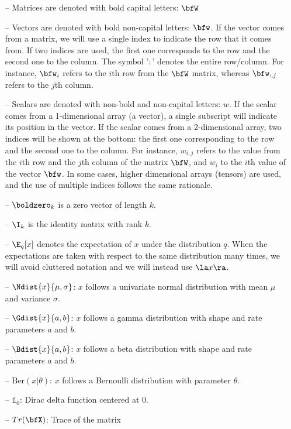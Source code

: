 \begin{itemize}[noitemsep]
	\item[--] Matrices are denoted with bold capital letters: $\bfW$
	\item[--] Vectors are denoted with bold non-capital letters: $\bfw$. If the vector comes from a matrix, we will use a single index to indicate the row that it comes from. If two indices are used, the first one corresponds to the row and the second one to the column. The symbol '$:$' denotes the entire row/column. For instance, $\bfw_{i}$ refers to the $i$th row from the $\bfW$ matrix, whereas $\bfw_{:,j}$ refers to the $j$th column.
	\item[--] Scalars are denoted with non-bold and non-capital letters: $w$. If the scalar comes from a 1-dimensional array (a vector), a single subscript will indicate its position in the vector. If the scalar comes from a 2-dimensional array, two indices will be shown at the bottom: the first one corresponding to the row and the second one to the column. For instance, $w_{i,j}$ refers to the value from the $i$th row and the $j$th column of the matrix $\bfW$, and $w_i$ to the $i$th value of the vector $\bfw$. In some cases, higher dimensional arrays (tensors) are used, and the use of multiple indices follows the same rationale.
	\item[--] $\boldzero_k$ is a zero vector of length $k$.
	\item[--] $\I_k$ is the identity matrix with rank $k$.
	\item[--] $\E_q[x]$ denotes the expectation of $x$ under the distribution $q$. When the expectations are taken with respect to the same distribution many times, we will avoid cluttered notation and we will instead use $\la x \ra$.
	\item[--] $\Ndist{x}{\mu,\sigma}$: $x$ follows a univariate normal distribution with mean $\mu$ and variance $\sigma$.
	\item[--] $\Gdist{x}{a,b}$: $x$ follows a gamma distribution with shape and rate parameters $a$ and $b$.
	\item[--] $\Bdist{x}{a, b}$: $x$ follows a beta distribution with shape and rate parameters $a$ and $b$.
	\item[--] $\text{Ber}(x|\theta)$: $x$ follows a Bernoulli distribution with parameter $\theta$.
	\item[--] $\mathds{1}_0$: Dirac delta function centered at 0.
	\item[--] $Tr(\bfX)$: Trace of the matrix \bfX
\end{itemize}

